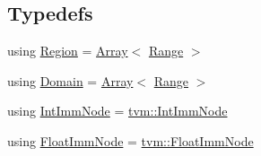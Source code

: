 \subsection*{Typedefs}
\begin{DoxyCompactItemize}
\item 
using \hyperlink{namespacetvm_1_1tir_a8277e2a3d81a80a4776705673df51e0a}{Region} = \hyperlink{classtvm_1_1Array}{Array}$<$ \hyperlink{classtvm_1_1Range}{Range} $>$
\item 
using \hyperlink{namespacetvm_1_1tir_aa177c432dd27540d34b22c05559324ab}{Domain} = \hyperlink{classtvm_1_1Array}{Array}$<$ \hyperlink{classtvm_1_1Range}{Range} $>$
\item 
using \hyperlink{namespacetvm_1_1tir_ae8c7db788e840dc1c2ed1f365d5ea829}{Int\+Imm\+Node} = \hyperlink{classtvm_1_1IntImmNode}{tvm\+::\+Int\+Imm\+Node}
\item 
using \hyperlink{namespacetvm_1_1tir_adb123be81447d2871f4c716ce2d1dc00}{Float\+Imm\+Node} = \hyperlink{classtvm_1_1FloatImmNode}{tvm\+::\+Float\+Imm\+Node}
\end{DoxyCompactItemize}
